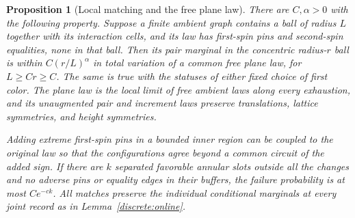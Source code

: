 \documentclass[11pt]{article}
\newtheorem{proposition}[theorem]{Proposition}
\theoremstyle{definition}
\theoremstyle{remark}
\numberwithin{equation}{section}
\begin{document}
\begin{proposition}[Local matching and the free plane law]\label{prop:local-mixing}
There are $C,\alpha>0$ with the following property. Suppose a finite
ambient graph contains a ball of radius $L$ together with its interaction
cells, and its law has first-spin pins and second-spin equalities, none
in that ball. Then its
pair marginal in the concentric radius-$r$ ball is within
$C(r/L)^\alpha$ in total variation of a common free plane law, for
$L\ge Cr\ge C$. The same is true with the statuses of either fixed
choice of first color. The plane law is the local limit of free ambient
laws along every exhaustion, and its unaugmented pair and increment
laws preserve translations, lattice symmetries, and height symmetries.

Adding extreme first-spin pins in a bounded inner region can be coupled
to the original law so that the configurations agree beyond a common
circuit of the added sign. If there are $k$ separated favorable annular
slots outside all the changes and no adverse pins or equality edges in
their buffers, the failure probability is at most $Ce^{-ck}$.
All matches preserve the individual conditional marginals at every joint
record as in Lemma~\ref{discrete:online}.
\end{proposition}
\end{document}
